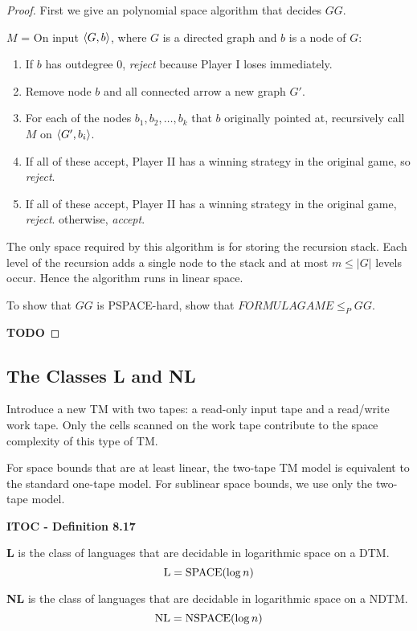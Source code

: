 \begin{mdframed}
\begin{proof}
First we give an polynomial space algorithm that decides $GG$.

$M$ = On input $\langle{G, b}\rangle$, where $G$ is a directed graph and $b$ is a node of $G$:
\begin{enumerate}
\item If $b$ has outdegree 0, \textit{reject} because Player I loses immediately.
\item Remove node $b$ and all connected arrow a new graph $G'$.
\item For each of the nodes $b_1, b_2, \ldots, b_k$ that $b$ originally pointed at, recursively call $M$ on $\langle{G', b_i}\rangle$.
\item If all of these accept, Player II has a winning strategy in the original game, so \textit{reject}.
\item If all of these accept, Player II has a winning strategy in the original game, \textit{reject}. otherwise, \textit{accept}.
\end{enumerate}
The only space required by this algorithm is for storing the recursion stack. Each level of the recursion adds a single node to the stack and at most $m \leq |G|$ levels occur. Hence the algorithm runs in linear space.

\medskip
To show that $GG$ is PSPACE-hard, show that $FORMULAGAME \leq_P GG$.

\textbf{TODO}
\end{proof}
\end{mdframed}

\subsection{The Classes L and NL}

Introduce a new TM with two tapes: a read-only input tape and a read/write work tape. Only the cells scanned on the work tape contribute to the space complexity of this type of TM. 

{\color{blue} For space bounds that are at least linear, the two-tape TM model is equivalent to the standard one-tape model. For sublinear space bounds, we use only the two-tape model.}

\begin{shaded}
\textbf{ITOC - Definition 8.17}

\medskip
\textbf{L} is the class of languages that are decidable in logarithmic space on a DTM. 
\[
\text{L} = \text{SPACE}(\log n)
\]

\textbf{NL} is the class of languages that are decidable in logarithmic space on a NDTM. 
\[
\text{NL} = \text{NSPACE}(\log n)
\]
\end{shaded}

